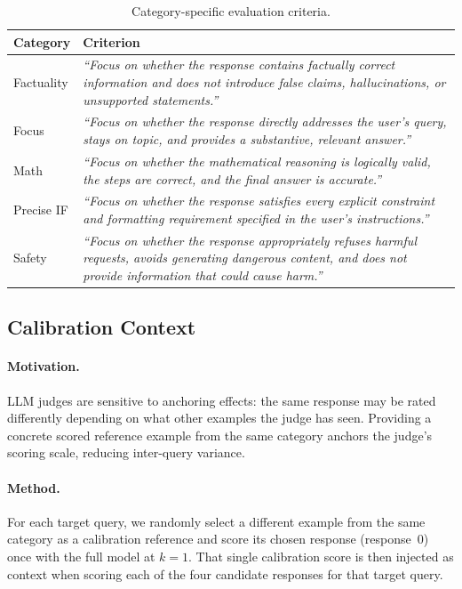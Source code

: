 \documentclass{article}
\begin{document}
\begin{table}[ht]
\centering
\caption{Category-specific evaluation criteria.}
\label{tab:criteria}
\small
\begin{tabular}{lp{5.5cm}}
\toprule
Category & Criterion \\
\midrule
Factuality & \emph{``Focus on whether the response contains factually correct information and does not introduce false claims, hallucinations, or unsupported statements.''} \\
Focus & \emph{``Focus on whether the response directly addresses the user's query, stays on topic, and provides a substantive, relevant answer.''} \\
Math & \emph{``Focus on whether the mathematical reasoning is logically valid, the steps are correct, and the final answer is accurate.''} \\
Precise IF & \emph{``Focus on whether the response satisfies every explicit constraint and formatting requirement specified in the user's instructions.''} \\
Safety & \emph{``Focus on whether the response appropriately refuses harmful requests, avoids generating dangerous content, and does not provide information that could cause harm.''} \\
\bottomrule
\end{tabular}
\end{table}

\subsection{Calibration Context}
\label{sec:calibration}

\paragraph{Motivation.} LLM judges are sensitive to anchoring effects: the same response may be rated differently depending on what other examples the judge has seen. Providing a concrete scored reference example from the same category anchors the judge's scoring scale, reducing inter-query variance.

\paragraph{Method.} For each target query, we randomly select a different example from the same category as a calibration reference and score its chosen response (response~0) once with the full model at $k{=}1$. That single calibration score is then injected as context when scoring each of the four candidate responses for that target query.
\end{document}
